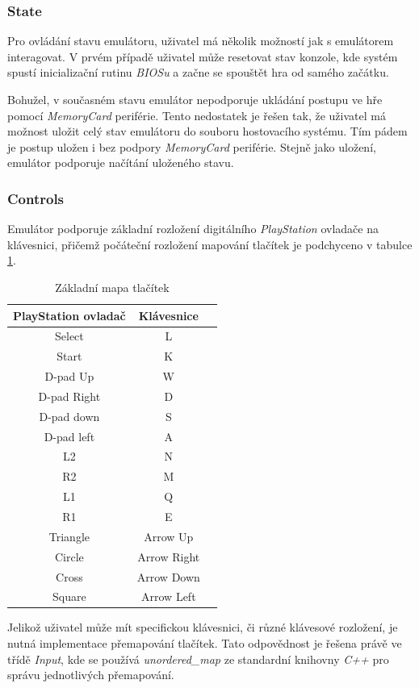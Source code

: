 \subsubsection{State}

Pro ovládání stavu emulátoru, uživatel má několik možností jak s emulátorem interagovat.
V prvém případě uživatel může resetovat stav konzole, kde systém spustí inicializační rutinu \textit{BIOSu} a začne
se spouštět hra od samého začátku.

Bohužel, v současném stavu emulátor nepodporuje ukládání postupu ve hře pomocí \textit{MemoryCard} periférie.
Tento nedostatek je řešen tak, že uživatel má možnost uložit celý stav emulátoru do souboru hostovacího systému.
Tím pádem je postup uložen i bez podpory \textit{MemoryCard} periférie.
Stejně jako uložení, emulátor podporuje načítání uloženého stavu.

\subsubsection{Controls}

Emulátor podporuje základní rozložení digitálního \textit{PlayStation} ovladače na klávesnici, přičemž počáteční rozložení mapování tlačítek je podchyceno v tabulce \ref{controls-map}.
\begin{table}[htbp]
    \caption{Základní mapa tlačítek}
    \begin{center}
    \begin{tabular}{ |c|c|c| }
    \hline
    \textbf{PlayStation ovladač} & \textbf{Klávesnice} \\
    \hline
    Select & L \\
    Start & K \\
    D-pad Up & W \\
    D-pad Right & D \\
    D-pad down & S \\
    D-pad left & A \\
    L2 & N \\
	R2 & M \\
    L1 & Q \\
    R1 & E \\
    Triangle & Arrow Up \\
    Circle & Arrow Right \\
    Cross & Arrow Down \\
    Square & Arrow Left \\
    \hline
    \end{tabular}
    \end{center}
    \label{controls-map}
\end{table}
Jelikož uživatel může mít specifickou klávesnici, či různé klávesové rozložení, je nutná implementace přemapování tlačítek.
Tato odpovědnost je řešena právě ve třídě \textit{Input}, kde se používá \textit{unordered\_map} ze standardní knihovny \textit{C++} pro správu jednotlivých přemapování.

